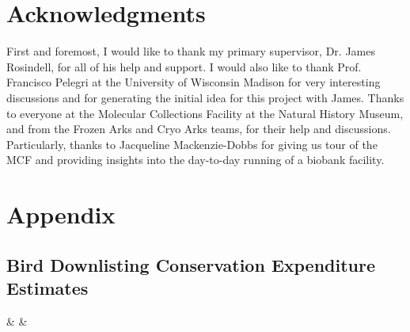 \documentclass[10pt]{article}
\begin{document}
	\section{Acknowledgments}
	First and foremost, I would like to thank my primary supervisor, Dr. James
	Rosindell, for all of his help and support. I would also like to thank
	Prof. Francisco Pelegri at the University of Wisconsin Madison for very
	interesting discussions and for generating the initial idea for this
	project with James. Thanks to everyone at the Molecular Collections
	Facility at the Natural History Museum, and from the Frozen Arks and
	Cryo Arks teams, for their help and discussions. Particularly, thanks to
	Jacqueline Mackenzie-Dobbs for giving us tour of the MCF and providing
	insights into the day-to-day running of a biobank facility.
	
	\section{Appendix}
	\subsection{Bird Downlisting Conservation Expenditure Estimates}\label{expen}
	{\thecsvrow & \status & \required}%
	
	
	
\end{document}
